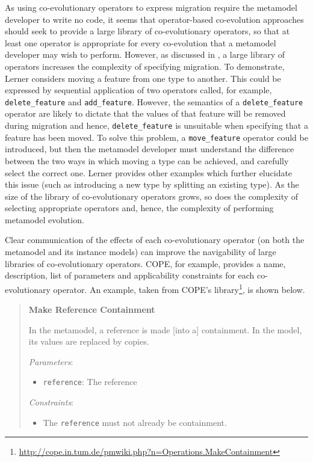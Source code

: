 As using co-evolutionary operators to express migration require the metamodel developer to write no code, it seems that operator-based co-evolution approaches should seek to provide a large library of co-evolutionary operators, so that at least one operator is appropriate for every co-evolution that a metamodel developer may wish to perform. However, as discussed in \cite{lerner00model}, a large library of operators increases the complexity of specifying migration. To demonstrate, Lerner considers moving a feature from one type to another. This could be expressed by sequential application of two operators called, for example, \texttt{delete\_feature} and \texttt{add\_feature}. However, the semantics of a \texttt{delete\_feature} operator are likely to dictate that the  values of that feature will be removed during migration and hence, \texttt{delete\_feature} is unsuitable when specifying that a feature has been moved. To solve this problem, a \texttt{move\_feature} operator could be introduced, but then the metamodel developer must understand the difference between the two ways in which moving a type can be achieved, and carefully select the correct one. Lerner provides other examples which further elucidate this issue (such as introducing a new type by splitting an existing type). As the size of the library of co-evolutionary operators grows, so does the complexity of selecting appropriate operators and, hence, the complexity of performing metamodel evolution.

Clear communication of the effects of each co-evolutionary operator (on both the metamodel and its instance models) can improve the navigability of large libraries of co-evolutionary operators. COPE, for example, provides a name, description, list of parameters and applicability constraints for each co-evolutionary operator. An example, taken from COPE's library\footnote{\url{http://cope.in.tum.de/pmwiki.php?n=Operations.MakeContainment}}, is shown below.

\begin{quote}
\textbf{Make Reference Containment}

In the metamodel, a reference is made [into a] containment. In the model, its values are replaced by copies.

\emph{Parameters}:
\begin{itemize}
	\item \texttt{reference}: The reference
\end{itemize}

\emph{Constraints}:
\begin{itemize}
	\item The \texttt{reference} must not already be containment.
\end{itemize}
\end{quote}

